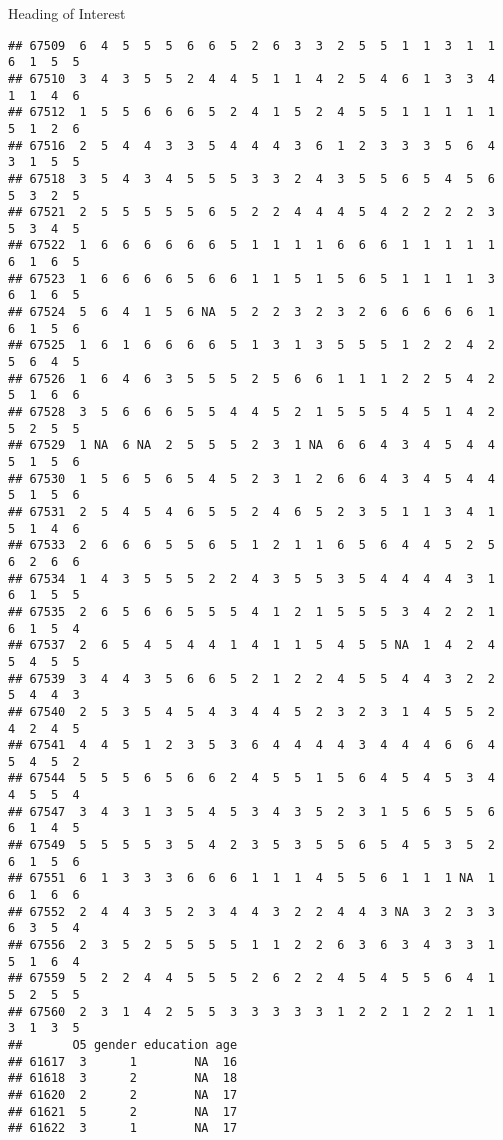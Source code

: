 \documentclass[
  ignorenonframetext,
]{beamer}
\begin{document}
\begin{frame}[fragile]{Heading of Interest}
\begin{verbatim}
## 67509  6  4  5  5  5  6  6  5  2  6  3  3  2  5  5  1  1  3  1  1  6  1  5  5
## 67510  3  4  3  5  5  2  4  4  5  1  1  4  2  5  4  6  1  3  3  4  1  1  4  6
## 67512  1  5  5  6  6  6  5  2  4  1  5  2  4  5  5  1  1  1  1  1  5  1  2  6
## 67516  2  5  4  4  3  3  5  4  4  4  3  6  1  2  3  3  3  5  6  4  3  1  5  5
## 67518  3  5  4  3  4  5  5  5  3  3  2  4  3  5  5  6  5  4  5  6  5  3  2  5
## 67521  2  5  5  5  5  5  6  5  2  2  4  4  4  5  4  2  2  2  2  3  5  3  4  5
## 67522  1  6  6  6  6  6  6  5  1  1  1  1  6  6  6  1  1  1  1  1  6  1  6  5
## 67523  1  6  6  6  6  5  6  6  1  1  5  1  5  6  5  1  1  1  1  3  6  1  6  5
## 67524  5  6  4  1  5  6 NA  5  2  2  3  2  3  2  6  6  6  6  6  1  6  1  5  6
## 67525  1  6  1  6  6  6  6  5  1  3  1  3  5  5  5  1  2  2  4  2  5  6  4  5
## 67526  1  6  4  6  3  5  5  5  2  5  6  6  1  1  1  2  2  5  4  2  5  1  6  6
## 67528  3  5  6  6  6  5  5  4  4  5  2  1  5  5  5  4  5  1  4  2  5  2  5  5
## 67529  1 NA  6 NA  2  5  5  5  2  3  1 NA  6  6  4  3  4  5  4  4  5  1  5  6
## 67530  1  5  6  5  6  5  4  5  2  3  1  2  6  6  4  3  4  5  4  4  5  1  5  6
## 67531  2  5  4  5  4  6  5  5  2  4  6  5  2  3  5  1  1  3  4  1  5  1  4  6
## 67533  2  6  6  6  5  5  6  5  1  2  1  1  6  5  6  4  4  5  2  5  6  2  6  6
## 67534  1  4  3  5  5  5  2  2  4  3  5  5  3  5  4  4  4  4  3  1  6  1  5  5
## 67535  2  6  5  6  6  5  5  5  4  1  2  1  5  5  5  3  4  2  2  1  6  1  5  4
## 67537  2  6  5  4  5  4  4  1  4  1  1  5  4  5  5 NA  1  4  2  4  5  4  5  5
## 67539  3  4  4  3  5  6  6  5  2  1  2  2  4  5  5  4  4  3  2  2  5  4  4  3
## 67540  2  5  3  5  4  5  4  3  4  4  5  2  3  2  3  1  4  5  5  2  4  2  4  5
## 67541  4  4  5  1  2  3  5  3  6  4  4  4  4  3  4  4  4  6  6  4  5  4  5  2
## 67544  5  5  5  6  5  6  6  2  4  5  5  1  5  6  4  5  4  5  3  4  4  5  5  4
## 67547  3  4  3  1  3  5  4  5  3  4  3  5  2  3  1  5  6  5  5  6  6  1  4  5
## 67549  5  5  5  5  3  5  4  2  3  5  3  5  5  6  5  4  5  3  5  2  6  1  5  6
## 67551  6  1  3  3  3  6  6  6  1  1  1  4  5  5  6  1  1  1 NA  1  6  1  6  6
## 67552  2  4  4  3  5  2  3  4  4  3  2  2  4  4  3 NA  3  2  3  3  6  3  5  4
## 67556  2  3  5  2  5  5  5  5  1  1  2  2  6  3  6  3  4  3  3  1  5  1  6  4
## 67559  5  2  2  4  4  5  5  5  2  6  2  2  4  5  4  5  5  6  4  1  5  2  5  5
## 67560  2  3  1  4  2  5  5  3  3  3  3  3  1  2  2  1  2  2  1  1  3  1  3  5
##       O5 gender education age
## 61617  3      1        NA  16
## 61618  3      2        NA  18
## 61620  2      2        NA  17
## 61621  5      2        NA  17
## 61622  3      1        NA  17

\end{verbatim}
\end{frame}
\end{document}
